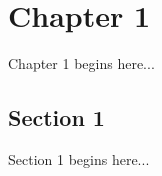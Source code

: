 \chapter{Chapter 1}
%
\label{chap:chap1}

Chapter 1 begins here...

\section{Section 1}
\label{sec:chap1sec1}

Section 1 begins here...
